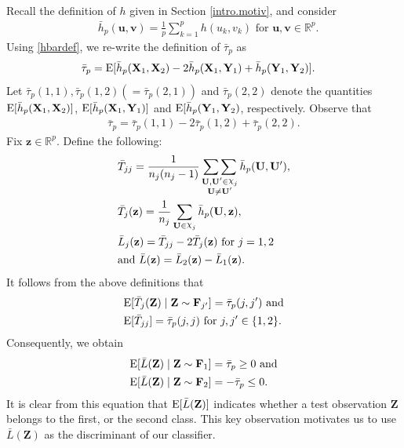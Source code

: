 \documentclass[twoside]{article}
\newcommand{\bX}{\mathbf{X}}
\newcommand{\bY}{\mathbf{Y}}
\newcommand{\bZ}{\mathbf{Z}}
\newcommand{\bF}{\mathbf{F}}
\newcommand{\bU}{\mathbf{U}}
\newcommand{\bz}{\mathbf{z}}
\newcommand{\bu}{\mathbf{u}}
\newcommand{\bv}{\mathbf{v}}
\newcommand{\0}{\mathbf{0}}
\newcommand{\1}{\mathbf{1}}
\DeclareRobustCommand{\rchi}{{\mathpalette\irchi\relax}}
\newcommand{\irchi}[2]{\raisebox{\depth}{$#1\chi$}} %
\numberwithin{equation}{section}
\begin{document}
Recall the definition of $h$ given in Section \ref{intro.motiv}, and consider
\vspace{-0.25cm}
\begin{align}\label{hbardef}
 & \bar{h}_p(\bu,\bv)= \frac{1}{p}\sum\limits_{k=1}^{p}h(u_k,v_k)\text{ for }\bu,\bv\in\mathbb{R}^p.
\end{align}
Using \eqref{hbardef}, we re-write the definition of $\bar{\tau}_p$ as
\begin{align*}
 &\bar{\tau}_p={\rm E}[ \bar{h}_p(\bX_{1},\bX_{2})-2 \bar{h}_p(\bX_{1},\bY_{1}) +  \bar{h}_p(\bY_{1},\bY_{2})].
\end{align*}
Let $\bar{\tau}_p(1,1),\bar{\tau}_p(1,2)(=\bar{\tau}_p(2,1))$ and $\bar{\tau}_p(2,2)$ denote the quantities ${\rm E} [\bar{h}_p(\bX_{1},\bX_{2})]$, ${\rm E}[\bar{h}_p(\bX_{1},\bY_{1})]$ and ${\rm E}[\bar{h}_p(\bY_{1},\bY_{2})$, respectively. Observe that
\vspace{-0.2cm}
\begin{align}\label{altdeftaubar}
 \bar{\tau}_p=\bar{\tau}_p(1,1)- 2\bar{\tau}_p(1,2) + \bar{\tau}_p(2,2).
\end{align}
Fix $\bz\in\mathbb{R}^p.$ Define the following:
\begin{align}\label{barLdef}
&{\bar{T}}_{jj}  = \frac{1}{n_j(n_j-1)}\mathop{\sum\sum}\limits_{\substack{ \bU,\bU^\prime\in\rchi_j \\ \bU\neq\bU^\prime}}\bar{h}_p(\bU,\bU^\prime),\nonumber\\
&\bar{T}_{j}(\bz) = \frac{1}{n_j}\sum\limits_{\bU\in\rchi_j}\bar{h}_p(\bU,\bz),\nonumber\\
& \bar{L}_j(\bz) = \bar{T}_{jj} - 2\bar{T}_{j}(\bz)\text{ for } j=1,2\nonumber\\
&\text{and }\bar{L}(\bz)=\bar{L}_{2}(\bz) - \bar{L}_{1}(\bz).
\end{align}
\noindent It follows from the above definitions that
\begin{align}\label{estexpect}
 &{\rm E}[ \bar{T}_{j}(\bZ)\mid\bZ\sim\bF_{j^\prime}]=\bar{\tau}_p(j,j^\prime)\text{ and}\nonumber \\
 &{\rm E}[ \bar{T}_{jj}]=\bar{\tau}_p(j,j)\text{ for }j,j^\prime\in\{1,2\} .
\end{align}
\noindent Consequently, we obtain
\begin{align}\label{motiv}
 &{\rm E}[ \bar{L}(\bZ) \mid\bZ\sim\bF_1] = \bar{\tau}_p\geq 0\text{ and}\nonumber \\
 &{\rm E}[ \bar{L}(\bZ) \mid\bZ\sim\bF_2] = -\bar{\tau}_p\leq 0.
\end{align}
It is clear from this equation that ${\rm E}[\bar{L}(\bZ)]$ indicates whether a test observation $\bZ$ belongs to the first, or the second class. This key observation motivates us to use $\bar{L}(\bZ)$ as the discriminant of our classifier.
\end{document}
